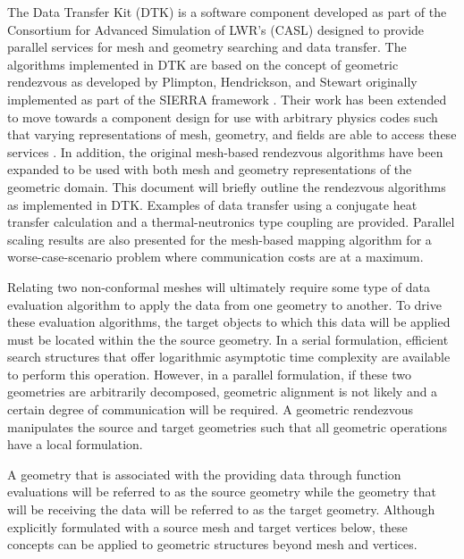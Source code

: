 \documentclass{mc2013}
\begin{document}
The Data Transfer Kit (DTK) is a software component developed as part
of the Consortium for Advanced Simulation of LWR's (CASL)
\cite{u.s._department_of_energy_casl_2011} designed to provide
parallel services for mesh and geometry searching and data
transfer. The algorithms implemented in DTK are based on the concept
of geometric rendezvous as developed by Plimpton, Hendrickson, and
Stewart \cite{Plimpton_2004} originally implemented as part of the
SIERRA framework \cite{Stewart_2004}. Their work has been extended to
move towards a component design for use with arbitrary physics codes
such that varying representations of mesh, geometry, and fields are
able to access these services \cite{Chand_2008}. In addition, the
original mesh-based rendezvous algorithms have been expanded
to be used with both mesh and geometry representations of the
geometric domain. This document will briefly outline the rendezvous
algorithms as implemented in DTK. Examples of data transfer using a
conjugate heat transfer calculation and a thermal-neutronics type
coupling are provided. Parallel scaling results are also presented for
the mesh-based mapping algorithm for a worse-case-scenario problem
where communication costs are at a maximum.


\label{sec:geometric_rendezvous}

Relating two non-conformal meshes will ultimately require some type of
data evaluation algorithm to apply the data from one geometry to
another. To drive these evaluation algorithms, the target objects to
which this data will be applied must be located within the the source
geometry. In a serial formulation, efficient search structures that
offer logarithmic asymptotic time complexity are available to perform
this operation. However, in a parallel formulation, if these two
geometries are arbitrarily decomposed, geometric alignment is not
likely and a certain degree of communication will be required. A
geometric rendezvous manipulates the source and target geometries such
that all geometric operations have a local formulation.

A geometry that is associated with the providing data through function
evaluations will be referred to as the source geometry while the
geometry that will be receiving the data will be referred to as the
target geometry. Although explicitly formulated with a source mesh and
target vertices below, these concepts can be applied to geometric
structures beyond mesh and vertices.
\end{document}
